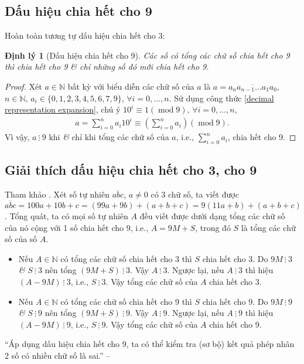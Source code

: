 \documentclass[oneside]{book}
\numberwithin{equation}{section}
\newtheorem{dinhly}{Định lý}[section]
\begin{document}
\subsection{Dấu hiệu chia hết cho 9}
Hoàn toàn tương tự dấu hiệu chia hết cho 3:

\begin{dinhly}[Dấu hiệu chia hết cho 9]
	Các số có tổng các chữ số chia hết cho 9 thì chia hết cho 9 \textit{\&} chỉ những số đó mới chia hết cho 9.
\end{dinhly}

\begin{proof}[Proof]
	Xét $a\in\mathbb{N}$ bất kỳ với biểu diễn các chữ số của $a$ là $a = \overline{a_na_{n-1}\ldots a_1a_0}$, $n\in\mathbb{N}$, $a_i\in\{0,1,2,3,4,5,6,7,9\}$, $\forall i = 0,\ldots,n$. Sử dụng công thức \eqref{decimal representation expansion}, chú ý $10^i\equiv 1(\operatorname{mod} 9)$, $\forall i = 0,\ldots,n$,
	\begin{align*}
		a = \sum_{i=0}^n a_i10^i\equiv\left(\sum_{i=0}^n a_i\right)(\operatorname{mod} 9).
	\end{align*}
	Vì vậy, $a\ \vdots\ 9$ khi \textit{\&} chỉ khi tổng các chữ số của $a$, i.e., $\sum_{i=0}^n a_i$, chia hết cho 9.
\end{proof}

\subsection{Giải thích dấu hiệu chia hết cho 3, cho 9}
Tham khảo \cite[p. 40]{Thai_Anh_Dat_Ha_Loan_Nam_Quang_Toan_6_tap_1}. Xét số tự nhiên $\overline{abc}$, $a\ne 0$ có 3 chữ số, ta viết được $\overline{abc} = 100a + 10b + c = (99a + 9b) + (a + b + c) = 9(11a + b) + (a + b + c)$. Tổng quát, ta có mọi số tự nhiên $A$ đều viết được dưới dạng tổng các chữ số của nó cộng với 1 số chia hết cho 9, i.e., $A = 9M + S$, trong đó $S$ là tổng các chữ số của số $A$.
\begin{itemize}
	\item Nếu $A\in\mathbb{N}$ có tổng các chữ số chia hết cho 3 thì $S$ chia hết cho 3. Do $9M\ \vdots\ 3$ \textit{\&} $S\ \vdots\ 3$ nên tổng $(9M + S)\ \vdots\ 3$. Vậy $A\ \vdots\ 3$. Ngược lại, nếu $A\ \vdots\ 3$ thì hiệu $(A - 9M)\ \vdots\ 3$, i.e., $S\ \vdots\ 3$. Vậy tổng các chữ số của $A$ chia hết cho 3.
	\item Nếu $A\in\mathbb{N}$ có tổng các chữ số chia hết cho 9 thì $S$ chia hết cho 9. Do $9M\ \vdots\ 9$ \textit{\&} $S\ \vdots\ 9$ nên tổng $(9M + S)\ \vdots\ 9$. Vậy $A\ \vdots\ 9$. Ngược lại, nếu $A\ \vdots\ 9$  thì hiệu $(A - 9M)\ \vdots\ 9$, i.e., $S\ \vdots\ 9$. Vậy tổng các chữ số của $A$ chia hết cho 9.
\end{itemize}
``Áp dụng dấu hiệu chia hết cho 9, ta có thể kiểm tra (sơ bộ) kết quả phép nhân 2 số có nhiều chữ số là sai.'' -- \cite[p. 40]{Thai_Anh_Dat_Ha_Loan_Nam_Quang_Toan_6_tap_1}
\end{document}
